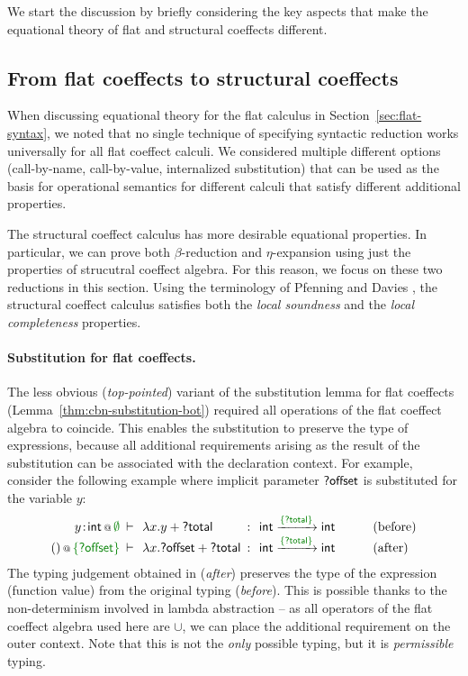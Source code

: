 We start the discussion by briefly considering the key aspects
that make the equational theory of flat and structural coeffects different.

\subsection{From flat coeffects to structural coeffects}
\label{sec:struct-syntax-intro}

When discussing equational theory for the flat calculus in Section~\ref{sec:flat-syntax}, we 
noted that no single technique of specifying syntactic reduction works universally for all 
flat coeffect calculi. We considered multiple different options (call-by-name, call-by-value, 
internalized substitution) that can be used as the basis for operational semantics for
different calculi that satisfy different additional properties. 

The structural coeffect calculus has more desirable equational properties. In particular, 
we can prove both $\beta$-reduction and $\eta$-expansion using just the properties of strucutral 
coeffect algebra. For this reason, we focus on these two reductions in this section.
Using the terminology of Pfenning and Davies \cite{logic-modal-reconstruction},
the structural coeffect calculus satisfies both the \emph{local soundness} and 
the \emph{local completeness} properties.

\paragraph{Substitution for flat coeffects.} 
The less obvious (\emph{top-pointed}) variant of the substitution lemma for flat coeffects 
(Lemma~\ref{thm:cbn-substitution-bot}) required all operations of the flat coeffect algebra
to coincide. This enables the substitution to preserve the type of expressions, because all
additional requirements arising as the result of the substitution can be associated with the
declaration context. For example, consider the following example where implicit parameter 
$\textnormal{\sffamily ?offset}$ is substituted for the variable $y$:
%
\begin{equation*}
\begin{array}{rclcll}
 \coctx{y\!:\!\ident{int}}{\cclrd{\emptyset}} &\narrow{\vdash}& \lambda x.y + \ident{?total} &\narrow{:}&
   \ident{int} \xrightarrow{\cclrd{ \{ \ident{?total} \} }} \ident{int} & \qquad(\textnormal{before}) \\
\coctx{()}{\cclrd{ \{ \ident{?offset} \} }} &\narrow{\vdash}& \lambda x.\ident{?offset} + \ident{?total} &\narrow{:}&
  \ident{int} \xrightarrow{\cclrd{ \{ \ident{?total} \} }} \ident{int} & \qquad(\textnormal{after})
\end{array}  
\end{equation*}
%
The typing judgement obtained in (\emph{after}) preserves the type of the expression
(function value) from the original typing (\emph{before}). This is possible thanks to the
non-determinism involved in lambda abstraction -- as all operators of the flat coeffect
algebra used here are $\cup$, we can place the additional requirement on the outer context.
Note that this is not the \emph{only} possible typing, but it is \emph{permissible} typing.

